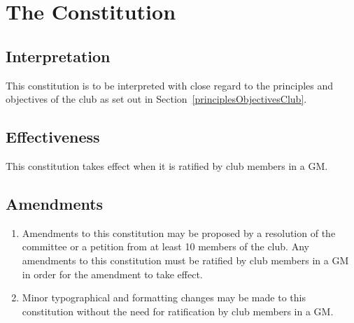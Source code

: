 \documentclass{constitution}
\begin{document}
\section{The Constitution}
\subsection{Interpretation}
This constitution is to be interpreted with close regard to the principles and objectives of the club as set out in Section~\ref{principlesObjectivesClub}.

\subsection{Effectiveness}
This constitution takes effect when it is ratified by club members in a GM.

\subsection{Amendments}
\begin{enumerate}[(1)]
    \item Amendments to this constitution may be proposed by a resolution of the committee or a petition from at least 10 members of the club. Any amendments to this constitution must be ratified by club members in a GM in order for the amendment to take effect.
    \item Minor typographical and formatting changes may be made to this constitution without the need for ratification by club members in a GM.
\end{enumerate}

\newpage

\end{document}
